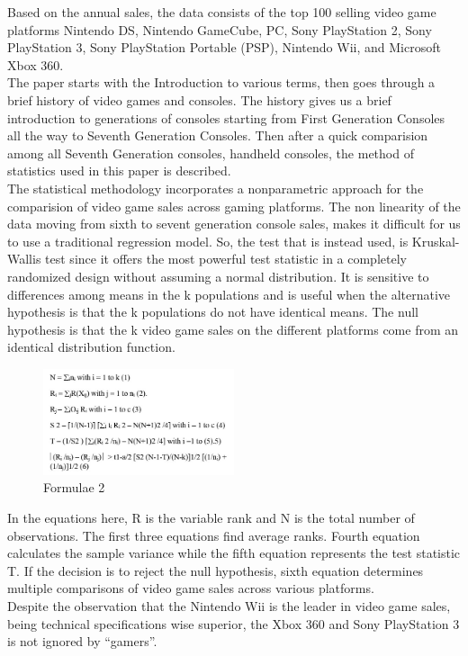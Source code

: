 \documentclass[conference]{IEEEtran}
\begin{document}
Based on the annual sales, the data consists of the top 100 selling video game platforms Nintendo DS, Nintendo GameCube, PC, Sony PlayStation 2, Sony PlayStation 3, Sony PlayStation Portable (PSP), Nintendo Wii, and Microsoft Xbox 360.\\
The paper starts with the Introduction to various terms, then goes through a brief history of video games and consoles. The history gives us a brief introduction to generations of consoles starting from First Generation Consoles all the way to Seventh Generation Consoles. Then after a quick comparision among all Seventh Generation consoles, handheld consoles, the method of statistics used in this paper is described.\\
The statistical methodology incorporates a nonparametric approach for the comparision of video game sales across gaming platforms. The non linearity of the data moving from sixth to sevent generation console sales, makes it difficult for us to use a traditional regression model. So, the test that is instead used, is Kruskal-Wallis test since it offers the most powerful test statistic in a completely randomized design without assuming a normal distribution. It is sensitive to differences among means in the k populations and is useful when the alternative hypothesis is that the k populations do not have identical means. The null hypothesis is that the k video game sales on the different platforms come from an identical distribution function.\\
\begin{figure}[h]
    \centering
    \includegraphics[width=0.5\textwidth]{L2F1.jpg}
    \caption{Formulae 2}
\end{figure}
In the equations here, R is the variable rank and N is the total number of observations. The first three equations find average ranks. Fourth equation calculates the sample variance while the fifth equation represents the test statistic T. If the decision is to reject the null hypothesis, sixth equation determines multiple comparisons of video game sales across various platforms.\\
Despite the observation that the Nintendo Wii is the leader in video game sales, being technical specifications wise superior, the Xbox 360 and Sony PlayStation 3 is not ignored by ``gamers''.\\
\end{document}
